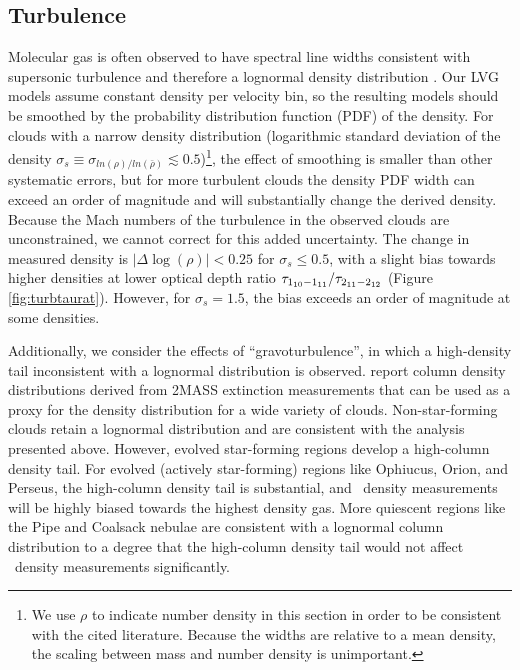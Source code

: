 \subsection{Turbulence}
\label{sec:turbulence}
Molecular gas is often observed to have spectral line widths consistent with
supersonic turbulence \citep{Kainulainen2009} and therefore a lognormal density
distribution \citep{Kritsuk2007}.  Our LVG models assume constant density per
velocity bin, so the resulting models should be smoothed by the probability
distribution function (PDF) of the density.  For clouds with a narrow density
distribution (logarithmic standard deviation of the density $\sigma_s \equiv
\sigma_{ln(\rho)/ln(\bar{\rho})}\lesssim0.5$)\footnote{We use $\rho$ to
indicate number density in this section in order to be consistent with the
cited literature.  Because the widths are relative to a mean density, the
scaling between mass and number density is unimportant.}, the effect of
smoothing is smaller than other systematic errors, but for more turbulent
clouds the density PDF width can exceed an order of magnitude \citep[e.g.,
][]{Federrath2010} and will substantially change the derived density.  Because
the Mach numbers of the turbulence in the observed clouds are unconstrained, we
cannot correct for this added uncertainty.  The change in measured density is
$|\Delta\log(\rho)|<0.25$ for $\sigma_s \le 0.5$, with a slight bias towards
higher densities at lower optical depth ratio $\tau_{1_{10}-1_{11}}/\tau_{2_{11}-2_{12}}$
(Figure \ref{fig:turbtaurat}).  However, for $\sigma_s=1.5$, the bias exceeds
an order of magnitude at some densities.

Additionally, we consider the effects of ``gravoturbulence'', in which a
high-density tail inconsistent with a lognormal distribution is observed.
\citet{Kainulainen2009} report column density distributions derived from 2MASS
extinction measurements that can be used as a proxy for the density
distribution for a wide variety of clouds.  Non-star-forming clouds retain a
lognormal distribution and are consistent with the analysis presented above.
However, evolved star-forming regions develop a high-column density tail.  For
evolved (actively star-forming) regions like Ophiucus, Orion, and Perseus,
the high-column density tail is substantial, and \formaldehyde\ density measurements
will be highly biased towards the highest density gas.  More quiescent regions
like the Pipe and Coalsack nebulae are consistent with a lognormal column
distribution to a degree that the high-column density tail would not affect
\formaldehyde\ density measurements significantly.


